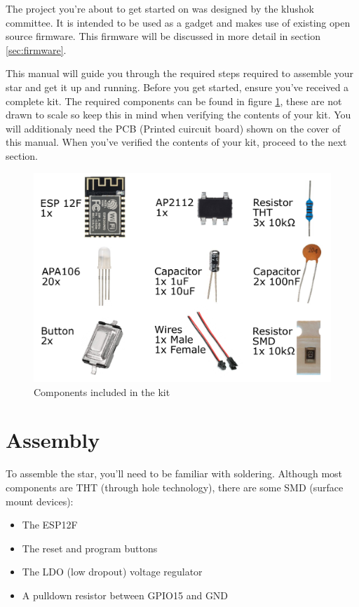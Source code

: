 \documentclass[12pt]{article}
\begin{document}
\noindent The project you're about to get started on was designed by the klushok committee. It is intended to be used as a gadget and makes use of existing open source firmware. This firmware will be discussed in more detail in section \ref{sec:firmware}.\vspace{1ex}

\noindent This manual will guide you through the required steps required to assemble your star and get it up and running.
Before you get started, ensure you've received a complete kit. The required components can be found in figure \ref{fig:kitContent}, these are not drawn to scale so keep this in mind when verifying the contents of your kit. You will additionaly  need the PCB (Printed cuircuit board) shown on the cover of this manual.
When you've verified the contents of your kit, proceed to the next section.

\begin{figure}[H]
	\centering
	\includegraphics[width=\textwidth]{../images/manual/partList.pdf}
	\caption{Components included in the kit}
	\label{fig:kitContent}
\end{figure}
\clearpage

\section{Assembly}

To assemble the star, you'll need to be familiar with soldering. Although most components are THT (through hole technology), there are some SMD (surface mount devices):
\begin{itemize}
	\item The ESP12F
	\item The reset and program buttons
	\item The LDO (low dropout) voltage regulator
	\item A pulldown resistor between GPIO15 and GND
\end{itemize}
\end{document}
